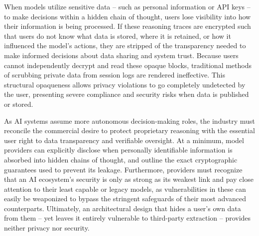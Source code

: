 When models utilize sensitive data -- such as personal information or API keys -- to make decisions within a hidden chain of thought, users lose visibility into how their information is being processed. If these reasoning traces are encrypted such that users do not know what data is stored, where it is retained, or how it influenced the model's actions, they are stripped of the transparency needed to make informed decisions about data sharing and system trust. Because users cannot independently decrypt and read these opaque blocks, traditional methods of scrubbing private data from session logs are rendered ineffective. This structural opaqueness allows privacy violations to go completely undetected by the user, presenting severe compliance and security risks when data is published or stored.  

As AI systems assume more autonomous decision-making roles, the industry must reconcile the commercial desire to protect proprietary reasoning with the essential user right to data transparency and verifiable oversight. At a minimum, model providers can explicitly disclose when personally identifiable information is absorbed into hidden chains of thought, and outline the exact cryptographic guarantees used to prevent its leakage. Furthermore, providers must recognize that an AI ecosystem's security is only as strong as its weakest link and pay close attention to their least capable or legacy models, as vulnerabilities in these can easily be weaponized to bypass the stringent safeguards of their most advanced counterparts. Ultimately, an architectural design that hides a user’s own data from them -- yet leaves it entirely vulnerable to third-party extraction -- provides neither privacy nor security. 

